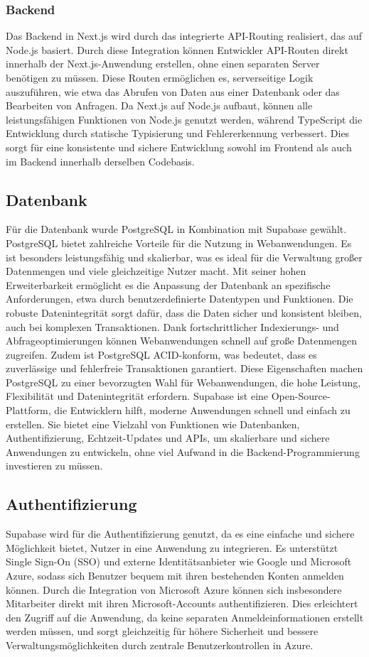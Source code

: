 \documentclass[a4paper,12pt]{article}
\begin{document}
\subsubsection{Backend}
Das Backend in Next.js wird durch das integrierte API-Routing realisiert, das auf Node.js basiert. Durch diese Integration können Entwickler API-Routen direkt innerhalb der Next.js-Anwendung erstellen, ohne einen separaten Server benötigen zu müssen. Diese Routen ermöglichen es, serverseitige Logik auszuführen, wie etwa das Abrufen von Daten aus einer Datenbank oder das Bearbeiten von Anfragen. Da Next.js auf Node.js aufbaut, können alle leistungsfähigen Funktionen von Node.js genutzt werden, während TypeScript die Entwicklung durch statische Typisierung und Fehlererkennung verbessert. Dies sorgt für eine konsistente und sichere Entwicklung sowohl im Frontend als auch im Backend innerhalb derselben Codebasis.
\newpage
\subsection{Datenbank}
Für die Datenbank wurde PostgreSQL in Kombination mit Supabase gewählt. PostgreSQL bietet zahlreiche Vorteile für die Nutzung in Webanwendungen. Es ist besonders leistungsfähig und skalierbar, was es ideal für die Verwaltung großer Datenmengen und viele gleichzeitige Nutzer macht. Mit seiner hohen Erweiterbarkeit ermöglicht es die Anpassung der Datenbank an spezifische Anforderungen, etwa durch benutzerdefinierte Datentypen und Funktionen. Die robuste Datenintegrität sorgt dafür, dass die Daten sicher und konsistent bleiben, auch bei komplexen Transaktionen. Dank fortschrittlicher Indexierungs- und Abfrageoptimierungen können Webanwendungen schnell auf große Datenmengen zugreifen. Zudem ist PostgreSQL ACID-konform, was bedeutet, dass es zuverlässige und fehlerfreie Transaktionen garantiert. Diese Eigenschaften machen PostgreSQL zu einer bevorzugten Wahl für Webanwendungen, die hohe Leistung, Flexibilität und Datenintegrität erfordern. Supabase ist eine Open-Source-Plattform, die Entwicklern hilft, moderne Anwendungen schnell und einfach zu erstellen. Sie bietet eine Vielzahl von Funktionen wie Datenbanken, Authentifizierung, Echtzeit-Updates und APIs, um skalierbare und sichere Anwendungen zu entwickeln, ohne viel Aufwand in die Backend-Programmierung investieren zu müssen.
\subsection{Authentifizierung}
Supabase wird für die Authentifizierung genutzt, da es eine einfache und sichere Möglichkeit bietet, Nutzer in eine Anwendung zu integrieren. Es unterstützt Single Sign-On (SSO) und externe Identitätsanbieter wie Google und Microsoft Azure, sodass sich Benutzer bequem mit ihren bestehenden Konten anmelden können. Durch die Integration von Microsoft Azure können sich insbesondere Mitarbeiter direkt mit ihren Microsoft-Accounts authentifizieren. Dies erleichtert den Zugriff auf die Anwendung, da keine separaten Anmeldeinformationen erstellt werden müssen, und sorgt gleichzeitig für höhere Sicherheit und bessere Verwaltungsmöglichkeiten durch zentrale Benutzerkontrollen in Azure.
\end{document}

